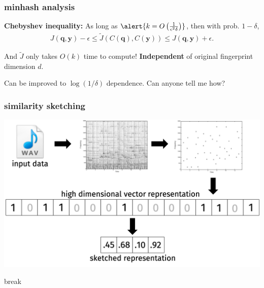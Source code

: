 \documentclass[compress]{beamer}
\newcommand{\bv}[1]{\mathbf{#1}}
\begin{document}
\begin{frame}
	\frametitle{minhash analysis}
	\textbf{Chebyshev inequality:} As long as $\alert{{k = O\left(\frac{1}{\epsilon^2\delta}\right)}}$, then with prob. $1-\delta$,
	\begin{align*}
		J(\bv{q}, \bv{y}) -\epsilon \leq \tilde{J}\left(C(\bv{q}),C(\bv{y})\right)   \leq J(\bv{q}, \bv{y}) + \epsilon. 
	\end{align*}
	\begin{center}
		And $\tilde{J}$ only takes $O(k)$ time to compute! \alert{\textbf{Independent}} of original fingerprint dimension $d$.
	\end{center}	
	
	Can be improved to $\log(1/\delta)$ dependence. Can anyone tell me how?
\end{frame}



\begin{frame}
	\frametitle{similarity sketching}
	\includegraphics[width=\textwidth]{sketch_paradigm.png}
\end{frame}

\begin{frame}[standout]
	\begin{center}
		break
	\end{center}
\end{frame}
\end{document}

